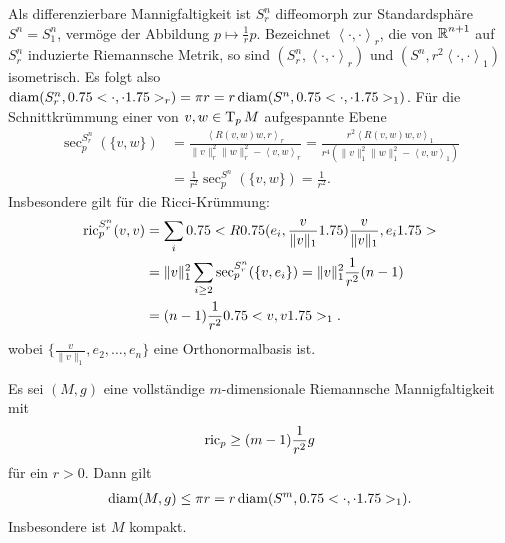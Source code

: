 Als differenzierbare Mannigfaltigkeit ist $S^n_r$ diffeomorph zur Standardsphäre $S^n = S^n_1$, vermöge der Abbildung $p \mapsto \frac{1}{r}p$. Bezeichnet $\left<\cdot,\cdot\right>_r$, die von
$\operatorname{\mathbb{R}}^{n+1}$ auf $S^n_r$ induzierte Riemannsche Metrik, so sind $(S^n_r,\left<\cdot,\cdot\right>_r)$ und $(S^n,r^2\left<\cdot,\cdot\right>_1)$ isometrisch.
Es folgt also $\operatorname{diam}(S^n_r,0.75<\cdot,\cdot1.75>_r) = \pi r = r \operatorname{diam}(S^n,0.75<\cdot,\cdot1.75>_1)$.
Für die Schnittkrümmung einer von $v,w \in \operatorname{T}_pM$ aufgespannte Ebene
\begin{align*}
  \sec_p^{S^n_r}(\{v,w\}) & =
  \frac{\left<R(v,w)w,r\right>_r}{\|v\|_r^2\|w\|_r^2-\left<v,w\right>_r}
  =
  \frac{r^2\left<R(v,w)w,v\right>_1}{r^4(\|v\|_1^2\|w\|_1^2-\left<v,w\right>_1)}\\
  & = \frac{1}{r^2} \sec_p^{S^n}(\{v,w\}) = \frac{1}{r^2}.
\end{align*}
Insbesondere gilt für die Ricci-Krümmung:
\begin{align*}
  \operatorname{ric}_p^{S_r^n}(v,v) & = \sum_i 0.75<R0.75(e_i,\frac{v}{\|v\|_1}1.75)\frac{v}{\|v\|_1},e_i1.75>\\
  & = \|v\|_1^2\sum_{i \geq 2}\sec_p^{S^n_r}(\{v,e_i\}) = \|v\|_1^2 \frac{1}{r^2}(n-1)\\
  & = (n-1)\frac{1}{r^2}0.75<v,v1.75>_1.
\end{align*}
wobei $\{\frac{v}{\|v\|_1}, e_2, \ldots, e_n\}$ eine Orthonormalbasis ist.

\begin{Satz}
  Es sei $(M,g)$ eine vollständige $m$-dimensionale Riemannsche Mannigfaltigkeit mit 
  \begin{align*}
    \operatorname{ric}_p \geq (m-1) \frac{1}{r^2} g
  \end{align*}
  für ein $r > 0$.
  Dann gilt
  \begin{align*}
    \operatorname{diam}(M,g) \leq \pi r = r \operatorname{diam}(S^m,0.75<\cdot,\cdot1.75>_1).
  \end{align*}
  Insbesondere ist $M$ kompakt.
\end{Satz}

